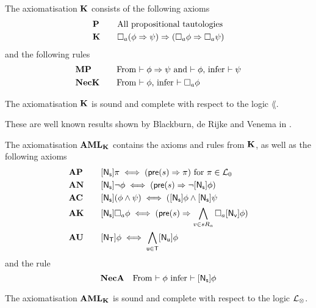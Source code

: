 \begin{defn} \label{axiomK}
The axiomatisation $\bf K$ consists of the following axioms
\begin{alignat*}{2}
	& \bf P && \quad \text{All propositional tautologies} \\
	& \bf K && \quad \Box_a(\phi \Rightarrow \psi) \Rightarrow (\Box_a \phi \Rightarrow \Box_a \psi)
\end{alignat*}
and the following rules
\begin{alignat*}{2}
	& \bf MP && \quad \text{From $\vdash \phi \Rightarrow \psi$ and $\vdash \phi$, infer $\vdash \psi$} \\
	& \bf NecK && \quad \text{From $\vdash \phi$, infer $\vdash \Box_a \phi$}
\end{alignat*}
\end{defn}

\begin{lemma} \label{axiomKSoundComplete}
The axiomatisation $\bf K$ is sound and complete with respect to the logic $\lang$.
\end{lemma}

These are well known results shown by Blackburn, de Rijke and Venema in \cite{blackburn2002modal}.

\begin{defn} \label{axiomAML}
The axiomatisation $\bf AML_{\bf K}$ contains the axioms and rules from $\bf K$, as well as the following axioms
\begin{alignat*}{2}
	& \bf AP && \quad [{\mathrm{\mathsf{N}}_\mathrm{\mathsf{s}}}]\pi \iff (\mathrm{\mathsf{pre}}(s) \Rightarrow \pi) \text{ for $\pi \in \mathcal{L}_0$}\\
	& \bf AN && \quad [{\mathrm{\mathsf{N}}_\mathrm{\mathsf{s}}}] \neg \phi \iff (\mathrm{\mathsf{pre}}(s) \Rightarrow \neg [{\mathrm{\mathsf{N}}_\mathrm{\mathsf{s}}}] \phi)\\
	& \bf AC && \quad [{\mathrm{\mathsf{N}}_\mathrm{\mathsf{s}}}](\phi \land \psi) \iff ([{\mathrm{\mathsf{N}}_\mathrm{\mathsf{s}}}]\phi \land
			[{\mathrm{\mathsf{N}}_\mathrm{\mathsf{s}}}]\psi\\
	& \bf AK && \quad [{\mathrm{\mathsf{N}}_\mathrm{\mathsf{s}}}]\Box_a\phi \iff (\mathrm{\mathsf{pre}}(s) \Rightarrow \bigwedge_{v \in s R_a}
		\Box_a [{\mathrm{\mathsf{N}}_\mathrm{\mathsf{v}}}] \phi) \\
	& \bf AU && \quad [{\mathrm{\mathsf{N}}_\mathrm{\mathsf{T}}}] \phi \iff \bigwedge_{\mathrm{\mathsf{u}} \in \mathrm{\mathsf{T}}} [{\mathrm{\mathsf{N}}_\mathrm{\mathsf{u}}}] \phi
\end{alignat*}
and the rule
\[
	\bf NecA \quad \text{From $\vdash \phi$ infer $\vdash [{\mathrm{\mathsf{N}}_\mathrm{\mathsf{s}}}] \phi$}
\]
\end{defn}

\begin{lemma} \label{axiomAMLSoundComplete}
The axiomatisation $\bf AML_{\bf K}$ is sound and complete with respect to the logic $\mathcal{L}_{\otimes}$.
\end{lemma}

